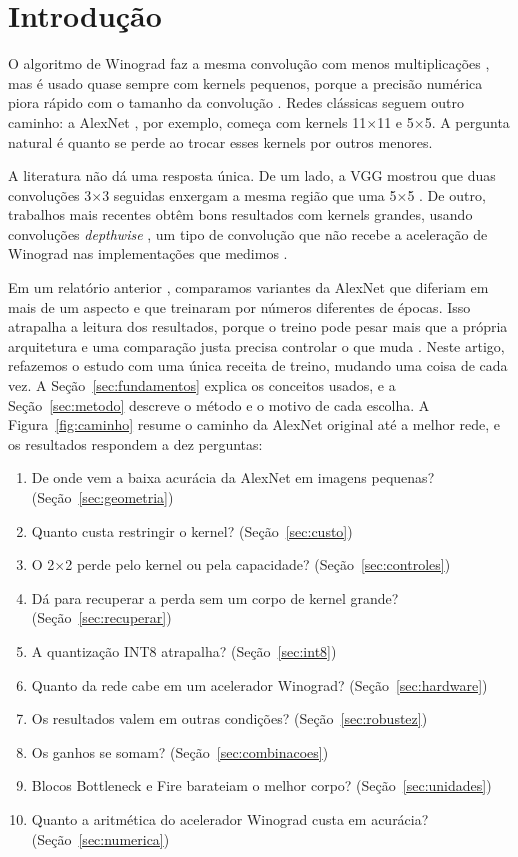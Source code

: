 \documentclass[conference]{IEEEtran}
\newcommand{\by}{\ensuremath{\times}}
\begin{document}
\section{Introdução}

O algoritmo de Winograd faz a mesma convolução com menos multiplicações \cite{lavin2016fast}, mas é usado quase sempre com kernels
pequenos, porque a precisão numérica piora rápido com o tamanho da convolução \cite{barabasz2020error}. Redes clássicas seguem outro
caminho: a AlexNet \cite{krizhevsky2012imagenet}, por exemplo, começa com kernels 11\by11 e 5\by5. A pergunta natural é quanto se perde
ao trocar esses kernels por outros menores.

A literatura não dá uma resposta única. De um lado, a VGG mostrou que duas convoluções 3\by3 seguidas enxergam a mesma região que uma
5\by5 \cite{simonyan2015very}. De outro, trabalhos mais recentes obtêm bons resultados com kernels grandes, usando convoluções
\textit{depthwise} \cite{liu2022convnext,ding2022scaling}, um tipo de convolução que não recebe a aceleração de Winograd nas
implementações que medimos \cite{souza2026relatorio}.

Em um relatório anterior \cite{souza2026relatorio}, comparamos variantes da AlexNet que diferiam em mais de um aspecto e que treinaram
por números diferentes de épocas. Isso atrapalha a leitura dos resultados, porque o treino pode pesar mais que a própria arquitetura
\cite{bello2021revisiting,wightman2021resnet} e uma comparação justa precisa controlar o que muda \cite{radosavovic2019network}. Neste
artigo, refazemos o estudo com uma única receita de treino, mudando uma coisa de cada vez. A Seção~\ref{sec:fundamentos} explica os
conceitos usados, e a Seção~\ref{sec:metodo} descreve o método e o motivo de cada escolha. A Figura~\ref{fig:caminho} resume o caminho
da AlexNet original até a melhor rede, e os resultados respondem a dez perguntas:
\begin{enumerate}
\item De onde vem a baixa acurácia da AlexNet em imagens pequenas? (Seção~\ref{sec:geometria})
\item Quanto custa restringir o kernel? (Seção~\ref{sec:custo})
\item O 2\by2 perde pelo kernel ou pela capacidade? (Seção~\ref{sec:controles})
\item Dá para recuperar a perda sem um corpo de kernel grande? (Seção~\ref{sec:recuperar})
\item A quantização INT8 atrapalha? (Seção~\ref{sec:int8})
\item Quanto da rede cabe em um acelerador Winograd? (Seção~\ref{sec:hardware})
\item Os resultados valem em outras condições? (Seção~\ref{sec:robustez})
\item Os ganhos se somam? (Seção~\ref{sec:combinacoes})
\item Blocos Bottleneck e Fire barateiam o melhor corpo? (Seção~\ref{sec:unidades})
\item Quanto a aritmética do acelerador Winograd custa em acurácia? (Seção~\ref{sec:numerica})
\end{enumerate}
\end{document}
